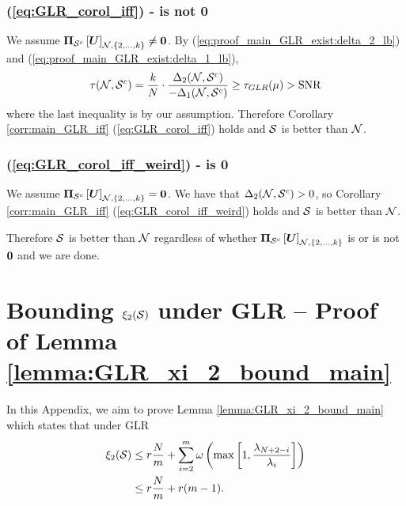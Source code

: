 \subsubsection{(\ref{eq:GLR_corol_iff}) - is not 0}
We assume $ \projgen{\set{S}^{c}}\msubgen[\set{N},\{2,\ldots,k\}]{\matr{U}} \neq \matr{0}$. By (\ref{eq:proof_main_GLR_exist:delta_2_lb}) and (\ref{eq:proof_main_GLR_exist:delta_1_lb}),
\begin{align}
    \tau(\mathcal{N},\mathcal{S}^{c}) = \frac{k}{N} \cdot \frac{\Delta_{2}(\mathcal{N},\mathcal{S}^{c})}{-\Delta_{1}(\mathcal{N},\mathcal{S}^{c})} \geq \tau_{GLR}(\mu) > \text{SNR}
\end{align}
where the last inequality is by our assumption. Therefore Corollary \ref{corr:main_GLR_iff}  (\ref{eq:GLR_corol_iff}) holds and  $\mathcal{S}$ is better than $\mathcal{N}$.
\subsubsection{(\ref{eq:GLR_corol_iff_weird}) - is 0}
We assume $ \projgen{\set{S}^{c}}\msubgen[\set{N},\{2,\ldots,k\}]{\matr{U}} = \matr{0}$. We have that $\Delta_{2}(\mathcal{N},\mathcal{S}^{c}) > 0$, so Corollary \ref{corr:main_GLR_iff} (\ref{eq:GLR_corol_iff_weird}) holds and $\mathcal{S}$ is better than $\mathcal{N}$.

Therefore $\mathcal{S}$ is better than $\mathcal{N}$ regardless of whether $\projgen{\set{S}^{c}}\msubgen[\set{N},\{2,\ldots,k\}]{\matr{U}}$ is or is not $\bm{0}$ and we are done.

\section{Bounding $\xi_{2}(\mathcal{S})$ under GLR -- Proof of Lemma \ref{lemma:GLR_xi_2_bound_main}}
\label{app:proof_unif_ub_xi_2}

In this Appendix, we aim to prove Lemma \ref{lemma:GLR_xi_2_bound_main} which states that under GLR
\begin{align}
    \xi_{2}(\mathcal{S}) &\leq r\frac{N}{m} + \sum_{i=2}^{m} \omega\left(\max\left[1,\frac{\lambda_{N+2-i}}{\lambda_{i}}\right]\right)  \label{eq:xi_2_GLR_bound_strong_appendix}
        \\ 
        &\leq r\frac{N}{m} + r(m -1) . \label{eq:xi_2_GLR_bound_weak_appendix}
\end{align}
